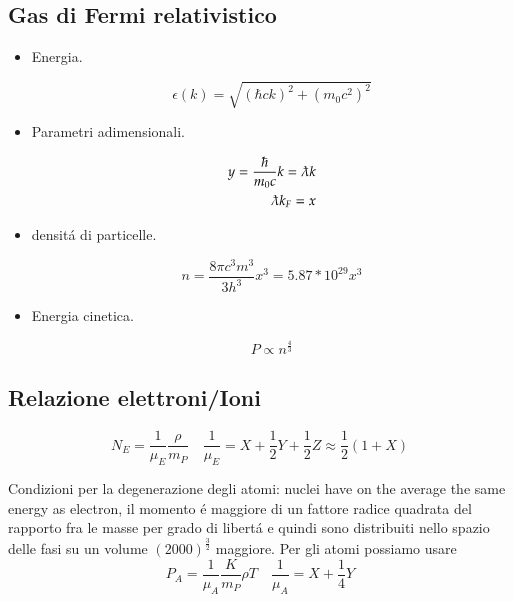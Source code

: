 \documentclass[main.tex]{subfiles}
\begin{document}
\subsection{Gas di Fermi relativistico}
\begin{itemize}

\item Energia.

\begin{equation*}
\epsilon(k)=\sqrt{(\hbar ck)^2+(m_0c^2)^2}
\end{equation*}

\item Parametri adimensionali.

\begin{align*}
y=\frac{\hbar}{m_0c}k=\lambdabar k\\
\lambdabar k_F=x
\end{align*}

\item densit\'a di particelle.

\begin{equation*}
n=\frac{8\pi c^3m^3}{3h^3}x^3=5.87*10^{29}x^3
\end{equation*}

\item Energia cinetica.

\begin{equation*}
P\propto n^{\frac{4}{3}}
\end{equation*}

\end{itemize}

\subsection{Relazione elettroni/Ioni}
\begin{equation*}
N_E=\frac{1}{\mu_E}\frac{\rho}{m_P}\quad\frac{1}{\mu_E}=X+\frac{1}{2}Y+\frac{1}{2}Z\approx\frac{1}{2}(1+X)
\end{equation*}

Condizioni per la degenerazione degli atomi: nuclei have on the average the same energy as electron, il momento \'e maggiore di un fattore radice quadrata del rapporto fra le masse per grado di libert\'a e quindi sono distribuiti nello spazio delle fasi su un volume $(2000)^{\frac{3}{2}}$ maggiore.
Per gli atomi possiamo usare
\begin{equation*}
P_A=\frac{1}{\mu_A}\frac{K}{m_P}\rho T\quad\frac{1}{\mu_A}=X+\frac{1}{4}Y
\end{equation*}
\end{document}
